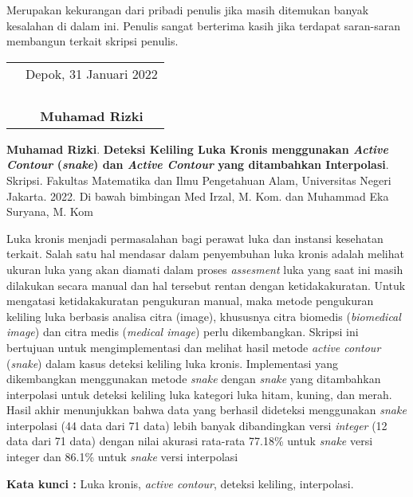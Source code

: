 \documentclass{jtetiskripsi}
\begin{document}
Merupakan kekurangan dari pribadi penulis jika masih ditemukan banyak kesalahan di dalam ini. Penulis sangat berterima kasih jika terdapat saran-saran membangun terkait skripsi penulis.

\vspace{.5cm}

\begin{tabular}{p{7.5cm}c}
	&Depok, 31 Januari 2022\\
	&\\
	&\\
	&\\
	&\\
	&\textbf{Muhamad Rizki}
\end{tabular}
\begin{abstractind}
	\textbf{Muhamad Rizki}. 	\textbf{Deteksi Keliling Luka Kronis menggunakan \emph{Active Contour} (\emph{snake}) dan \emph{Active Contour} yang ditambahkan Interpolasi}. Skripsi. Fakultas Matematika dan Ilmu Pengetahuan Alam, Universitas Negeri Jakarta. 2022. Di bawah bimbingan Med Irzal, M. Kom. dan Muhammad Eka Suryana, M. Kom
	\vskip1cm
	
	Luka kronis menjadi permasalahan bagi perawat luka dan instansi kesehatan terkait. Salah satu hal mendasar dalam penyembuhan luka kronis adalah melihat ukuran luka yang akan diamati dalam proses \emph{assesment} luka yang saat ini masih dilakukan secara manual dan hal tersebut rentan dengan ketidakakuratan. Untuk mengatasi ketidakakuratan pengukuran manual, maka metode pengukuran keliling luka berbasis analisa citra (image), khususnya citra biomedis (\emph{biomedical image}) dan citra medis (\emph{medical image}) perlu dikembangkan. Skripsi ini bertujuan untuk mengimplementasi dan melihat hasil metode \emph{active contour} (\emph{snake}) dalam kasus deteksi keliling luka kronis. Implementasi yang dikembangkan menggunakan metode \emph{snake} dengan \emph{snake} yang ditambahkan interpolasi untuk deteksi keliling luka kategori luka hitam, kuning, dan merah. Hasil akhir menunjukkan bahwa data yang berhasil dideteksi menggunakan \emph{snake} interpolasi (44 data dari 71 data) lebih banyak dibandingkan versi \emph{integer} (12 data dari 71 data) dengan nilai akurasi rata-rata 77.18\% untuk \emph{snake} versi integer dan 86.1\% untuk \emph{snake} versi interpolasi
	
	\bigskip
	\noindent
	\textbf{Kata kunci :} Luka kronis, \emph{active contour}, deteksi keliling, interpolasi.
\end{abstractind}
\end{document}
